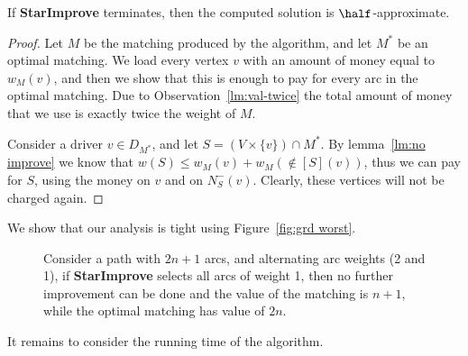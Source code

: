 \begin{lemma}
If \textbf{StarImprove} terminates, then the computed solution is
$\half$-approximate.
\end{lemma}
\begin{proof}
Let $M$ be the matching produced by the algorithm, and let $M^*$ be an
optimal matching.  We load every vertex $v$ with an amount of money
equal to $w_M(v)$, and then we show that this is enough to pay for
every arc in the optimal matching.  Due to
Observation~\ref{lm:val-twice} the total amount of money that we use
is exactly twice the weight of $M$.

Consider a driver $v \in D_{M^*}$, and let $S = (V \times \{v\}) \cap
M^*$.  By lemma~\ref{lm:no improve} we know that $w(S) \leq w_M(v) +
w_M(\nin[S](v))$, thus we can pay for $S$, using the money on $v$ and
on $N^-_S(v)$.  Clearly, these vertices will not be charged again.
\end{proof}

We show that our analysis is tight using Figure~\ref{fig:grd
worst}.

\begin{figure}
\centering
{}
\caption[]{%
Consider a path with $2n + 1$ arcs, and alternating arc weights (2 and
1), if \textbf{StarImprove} selects all arcs of weight 1, then no
further improvement can be done and the value of the matching is $n +
1$, while the optimal matching has value of $2n$.}
\label{fig:grd worst}
\end{figure}

It remains to consider the running time of the algorithm.

